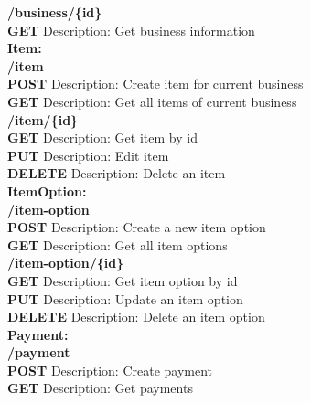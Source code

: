 \documentclass[11pt,a4paper,pdftex]{article}
\begin{document}
\hspace*{1em}\textbf{/business/\{id\}}\\
\hspace*{2em}\textbf{GET} Description: Get business information\\

\textbf{Item:}\\
\hspace*{1em}\textbf{/item}\\
\hspace*{2em}\textbf{POST} Description: Create item for current business\\
\hspace*{2em}\textbf{GET} Description: Get all items of current business\\

\hspace*{1em}\textbf{/item/\{id\}}\\
\hspace*{2em}\textbf{GET} Description: Get item by id\\
\hspace*{2em}\textbf{PUT} Description: Edit item\\
\hspace*{2em}\textbf{DELETE} Description: Delete an item\\

\textbf{ItemOption:}\\
\hspace*{1em}\textbf{/item-option}\\
\hspace*{2em}\textbf{POST} Description: Create a new item option\\
\hspace*{2em}\textbf{GET} Description: Get all item options\\

\hspace*{1em}\textbf{/item-option/\{id\}}\\
\hspace*{2em}\textbf{GET} Description: Get item option by id\\
\hspace*{2em}\textbf{PUT} Description: Update an item option\\
\hspace*{2em}\textbf{DELETE} Description: Delete an item option\\

\textbf{Payment:}\\
\hspace*{1em}\textbf{/payment}\\
\hspace*{2em}\textbf{POST} Description: Create payment\\
\hspace*{2em}\textbf{GET} Description: Get payments\\
\end{document}
